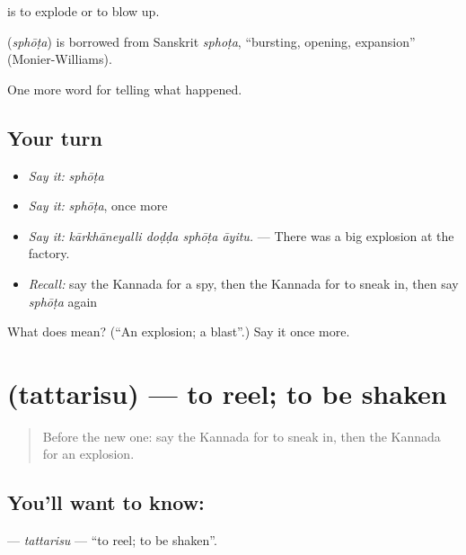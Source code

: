  is to explode or to blow up.

\begin{cousinweb}
\textbf{} (\emph{sphōṭa}) is borrowed from Sanskrit \emph{sphoṭa}, \textquotedblleft{}bursting, opening, expansion\textquotedblright{} (Monier-Williams).
\end{cousinweb}

\begin{grammarlens}[title={What you've built}]
One more word for telling what happened.
\end{grammarlens}

\subsection*{Your turn}
\begin{itemize}
\raggedright
  \item \emph{Say it:} \emph{sphōṭa}
  \item \emph{Say it:} \emph{sphōṭa}, once more
  \item \emph{Say it:} \emph{kārkhāneyalli doḍḍa sphōṭa āyitu.} — There was a big explosion at the factory.
  \item \emph{Recall:} say the Kannada for a spy, then the Kannada for to sneak in, then say \emph{sphōṭa} again
\end{itemize}

\begin{tcolorbox}[breakable,colback=teal!4,colframe=teal!35!black,title={Before you move on}]
What does  mean? (\textquotedblleft{}An explosion; a blast\textquotedblright{}.) Say it once more.
\end{tcolorbox}
\section[\texorpdfstring{\kn{ತತ್ತರಿಸು} (tattarisu)}{ತತ್ತರಿಸು (tattarisu)}]{ (tattarisu) — to reel; to be shaken}

\label{lesson:KA-C346-tattarisu}



\begin{quote}
Before the new one: say the Kannada for to sneak in, then the Kannada for an explosion.
\end{quote}

\subsection*{You'll want to know: }
\textbf{} — \emph{tattarisu} — \textquotedblleft{}to reel; to be shaken\textquotedblright{}.

